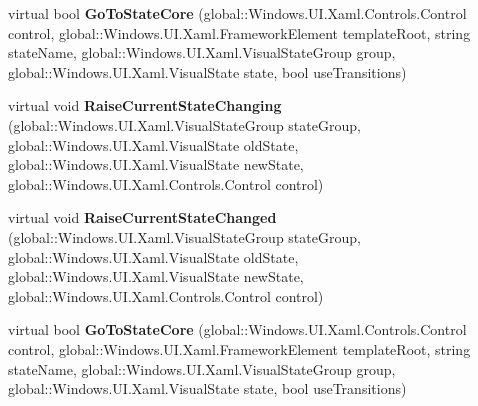 \begin{DoxyCompactItemize}
\item 
\mbox{\label{class_windows_1_1_u_i_1_1_xaml_1_1_visual_state_manager_a8c0de7e6b9bdb57e46befcf69225644e}} 
virtual bool {\bfseries Go\+To\+State\+Core} (global\+::\+Windows.\+U\+I.\+Xaml.\+Controls.\+Control control, global\+::\+Windows.\+U\+I.\+Xaml.\+Framework\+Element template\+Root, string state\+Name, global\+::\+Windows.\+U\+I.\+Xaml.\+Visual\+State\+Group group, global\+::\+Windows.\+U\+I.\+Xaml.\+Visual\+State state, bool use\+Transitions)
\item 
\mbox{\label{class_windows_1_1_u_i_1_1_xaml_1_1_visual_state_manager_a50a0e31984a4bf6d06bb7e56db64a21f}} 
virtual void {\bfseries Raise\+Current\+State\+Changing} (global\+::\+Windows.\+U\+I.\+Xaml.\+Visual\+State\+Group state\+Group, global\+::\+Windows.\+U\+I.\+Xaml.\+Visual\+State old\+State, global\+::\+Windows.\+U\+I.\+Xaml.\+Visual\+State new\+State, global\+::\+Windows.\+U\+I.\+Xaml.\+Controls.\+Control control)
\item 
\mbox{\label{class_windows_1_1_u_i_1_1_xaml_1_1_visual_state_manager_a64847abd05cfc83d3fd14ec421fe7261}} 
virtual void {\bfseries Raise\+Current\+State\+Changed} (global\+::\+Windows.\+U\+I.\+Xaml.\+Visual\+State\+Group state\+Group, global\+::\+Windows.\+U\+I.\+Xaml.\+Visual\+State old\+State, global\+::\+Windows.\+U\+I.\+Xaml.\+Visual\+State new\+State, global\+::\+Windows.\+U\+I.\+Xaml.\+Controls.\+Control control)
\item 
\mbox{\label{class_windows_1_1_u_i_1_1_xaml_1_1_visual_state_manager_a8c0de7e6b9bdb57e46befcf69225644e}} 
virtual bool {\bfseries Go\+To\+State\+Core} (global\+::\+Windows.\+U\+I.\+Xaml.\+Controls.\+Control control, global\+::\+Windows.\+U\+I.\+Xaml.\+Framework\+Element template\+Root, string state\+Name, global\+::\+Windows.\+U\+I.\+Xaml.\+Visual\+State\+Group group, global\+::\+Windows.\+U\+I.\+Xaml.\+Visual\+State state, bool use\+Transitions)
\item 
\mbox{\label{class_windows_1_1_u_i_1_1_xaml_1_1_visual_state_manager_a50a0e31984a4bf6d06bb7e56db64a21f}} 

\end{DoxyCompactItemize}
